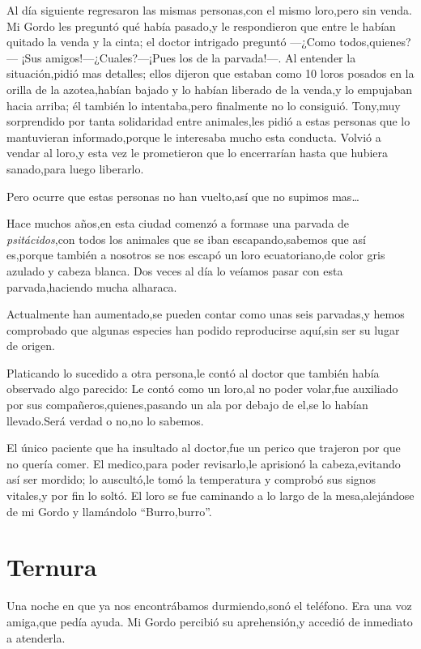 \documentclass[letterpaper,12pt]{book}
\begin{document}
Al día siguiente regresaron las mismas personas,con el mismo loro,pero sin venda. Mi Gordo les preguntó qué había pasado,y le respondieron que entre le habían quitado la venda y la cinta; el doctor intrigado preguntó ---¿Como todos,quienes?---
¡Sus amigos!---¿Cuales?---¡Pues los de la parvada!---. Al entender la situación,pidió mas detalles; ellos dijeron que estaban como 10 loros posados en la orilla de la azotea,habían bajado y lo habían liberado de la venda,y lo empujaban hacia arriba; él también lo intentaba,pero finalmente no lo consiguió. Tony,muy sorprendido por tanta solidaridad entre animales,les pidió a estas personas que lo mantuvieran informado,porque le interesaba mucho esta conducta. Volvió a vendar al loro,y esta vez le prometieron que lo encerrarían hasta que hubiera sanado,para luego liberarlo.

Pero ocurre que estas personas no han vuelto,así que no supimos mas\ldots

Hace muchos años,en esta ciudad comenzó a formase una parvada de {\it psitácidos},con todos los animales que se iban escapando,sabemos que así es,porque también a nosotros se nos escapó un loro ecuatoriano,de color gris azulado y cabeza blanca. Dos veces al día lo veíamos pasar con esta parvada,haciendo mucha alharaca. 

Actualmente han aumentado,se pueden contar como unas seis parvadas,y hemos comprobado que algunas especies han podido reproducirse aquí,sin ser su lugar de origen.

Platicando lo sucedido a otra persona,le contó al doctor que también había observado algo parecido: Le contó como un loro,al no poder volar,fue auxiliado por sus compañeros,quienes,pasando un ala por debajo de el,se lo habían llevado.Será verdad o no,no lo sabemos.

El único paciente que ha insultado al doctor,fue un perico que trajeron por que no quería comer. El medico,para poder revisarlo,le aprisionó la cabeza,evitando así ser mordido; lo auscultó,le tomó la temperatura y comprobó sus signos vitales,y por fin lo soltó. El loro se fue caminando a lo largo de la mesa,alejándose de mi Gordo y llamándolo ``Burro,burro''.


\chapter{Ternura}
Una noche en que ya nos encontrábamos durmiendo,sonó el teléfono. Era una voz amiga,que pedía ayuda. Mi Gordo percibió su aprehensión,y accedió de inmediato a atenderla. 
\end{document}

